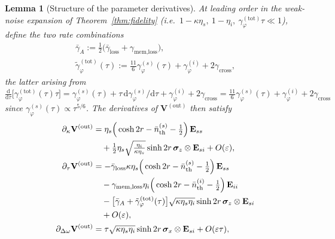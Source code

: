 \documentclass[journal]{IEEEtran}
\newtheorem{lemma}{Lemma}
\begin{document}
\begin{lemma}[Structure of the parameter derivatives]\label{lem:derivative_structure}
At leading order in the weak-noise expansion of Theorem~\ref{thm:fidelity} (i.e.\ $1-\kappa\eta_s,\ 1-\eta_i,\ \gamma_\varphi^{(\text{tot})}\tau\ll1$), define the two rate combinations
\begin{equation}\label{eq:effective_rates}
\begin{gathered}
\bar\gamma_A := \tfrac12\big(\bar\gamma_{\text{loss}}+\gamma_{\text{mem,loss}}\big), \\
\tilde\gamma_\varphi^{(\text{tot})}(\tau) := \tfrac{11}{6}\gamma_\varphi^{(s)}(\tau)+\gamma_\varphi^{(i)}+2\gamma_{\text{cross}},
\end{gathered}
\end{equation}
the latter arising from $\tfrac{\mathrm d}{\mathrm d\tau}\big[\gamma_\varphi^{(\text{tot})}(\tau)\tau\big] = \gamma_\varphi^{(s)}(\tau)+\tau\,\mathrm d\gamma_\varphi^{(s)}/\mathrm d\tau+\gamma_\varphi^{(i)}+2\gamma_{\text{cross}} = \tfrac{11}{6}\gamma_\varphi^{(s)}(\tau)+\gamma_\varphi^{(i)}+2\gamma_{\text{cross}}$ since $\gamma_\varphi^{(s)}(\tau)\propto\tau^{5/6}$. The derivatives of $\mathbf V^{(\text{out})}$ then satisfy
\begin{align}
\partial_\kappa \mathbf V^{(\text{out})} &= \eta_s\Big(\cosh2r-\bar n_{\text{th}}^{(s)}-\tfrac12\Big)\,\mathbf E_{ss} \notag\\
&\quad + \tfrac12\eta_s\sqrt{\tfrac{\eta_i}{\kappa\eta_s}}\sinh2r\,\boldsymbol\sigma_z\otimes\mathbf E_{si} + O(\varepsilon),\\
\partial_\tau \mathbf V^{(\text{out})} &= -\bar\gamma_{\text{loss}}\kappa\eta_s\Big(\cosh2r-\bar n_{\text{th}}^{(s)}-\tfrac12\Big)\,\mathbf E_{ss} \notag\\
&\quad -\gamma_{\text{mem,loss}}\eta_i\Big(\cosh2r-\bar n_{\text{th}}^{(i)}-\tfrac12\Big)\,\mathbf E_{ii} \notag\\
&\quad -\big[\bar\gamma_A+\tilde\gamma_\varphi^{(\text{tot})}(\tau)\big]\sqrt{\kappa\eta_s\eta_i}\sinh2r\,\boldsymbol\sigma_z\otimes\mathbf E_{si}\notag\\
&\quad +O(\varepsilon),\\
\partial_{\Delta\omega}\mathbf V^{(\text{out})} &= \tau\sqrt{\kappa\eta_s\eta_i}\sinh2r\,\boldsymbol\sigma_x\otimes\mathbf E_{si}+O(\varepsilon\tau),
\end{align}

\end{lemma}
\end{document}

